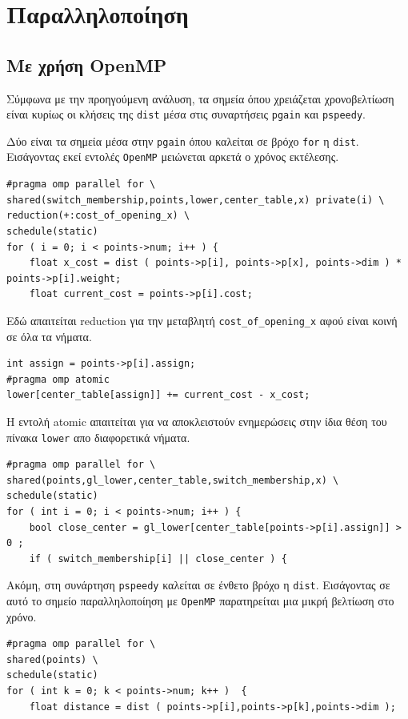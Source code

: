 \documentclass{article}
\begin{document}
\section{Παραλληλοποίηση}
\subsection{Με χρήση OpenMP}
Σύμφωνα με την προηγούμενη ανάλυση, τα σημεία όπου χρειάζεται χρονοβελτίωση είναι κυρίως οι κλήσεις της \texttt{dist} μέσα στις συναρτήσεις \texttt{pgain} και \texttt{pspeedy}.

Δύο είναι τα σημεία μέσα στην \texttt{pgain} όπου καλείται σε βρόχο \texttt{for} η \texttt{dist}. Εισάγοντας εκεί εντολές \texttt{OpenMP} μειώνεται αρκετά ο χρόνος εκτέλεσης.
\begin{lstlisting}
#pragma omp parallel for \
shared(switch_membership,points,lower,center_table,x) private(i) \
reduction(+:cost_of_opening_x) \
schedule(static)
for ( i = 0; i < points->num; i++ ) {
    float x_cost = dist ( points->p[i], points->p[x], points->dim ) * points->p[i].weight;
    float current_cost = points->p[i].cost;
\end{lstlisting}
Εδώ απαιτείται reduction για την μεταβλητή \texttt{cost\_of\_opening\_x} αφού είναι κοινή σε όλα τα νήματα.

\begin{lstlisting}
int assign = points->p[i].assign;
#pragma omp atomic
lower[center_table[assign]] += current_cost - x_cost;
\end{lstlisting}
Η εντολή atomic απαιτείται για να αποκλειστούν ενημερώσεις στην ίδια θέση του πίνακα \texttt{lower} απο διαφορετικά νήματα.

\begin{lstlisting}
#pragma omp parallel for \
shared(points,gl_lower,center_table,switch_membership,x) \
schedule(static)
for ( int i = 0; i < points->num; i++ ) {
    bool close_center = gl_lower[center_table[points->p[i].assign]] > 0 ;
    if ( switch_membership[i] || close_center ) {
\end{lstlisting}

Ακόμη, στη συνάρτηση \texttt{pspeedy} καλείται σε ένθετο βρόχο η \texttt{dist}. Εισάγοντας σε αυτό το σημείο παραλληλοποίηση με \texttt{OpenMP} παρατηρείται μια μικρή βελτίωση στο χρόνο.

\begin{lstlisting}
#pragma omp parallel for \
shared(points) \
schedule(static)
for ( int k = 0; k < points->num; k++ )  {
    float distance = dist ( points->p[i],points->p[k],points->dim );
\end{lstlisting}
\end{document}
